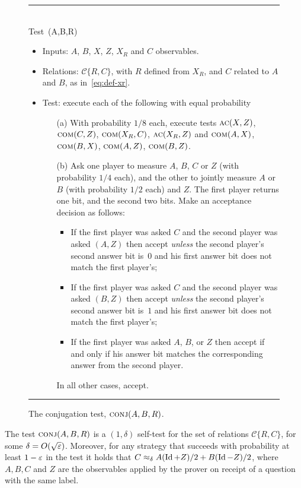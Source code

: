 \begin{figure}[H]
\rule[1ex]{\textwidth}{0.5pt}\\
Test~\conj(A,B,R) 
\begin{itemize}
    \item Inputs: $A$, $B$, $X$, $Z$, $X_R$ and $C$ observables.
    \item Relations:  $\mathcal{C}\{R,C\} $, with $R$ defined from $X_R$, and $C$ related to $A$ and $B$, as in~\eqref{eq:def-xr}. 
    \item Test: execute each of the following with equal probability
		\begin{enumerate}
\item[(a)] With probability $1/8$ each, execute tests $\textsc{ac}(X,Z)$,  $\textsc{com}(C,Z)$, $\textsc{com}(X_R,C)$,   $\textsc{ac}(X_R,Z)$ and $\textsc{com}(A,X)$, $\textsc{com}(B,X)$, $\textsc{com}(A,Z)$, $\textsc{com}(B,Z)$. 
\item[(b)] Ask one player to measure $A$, $B$, $C$ or $Z$ (with probability $1/4$ each), and the other to jointly measure $A$ or $B$ (with probability $1/2$ each) and $Z$. The first player returns one bit, and the second two bits. Make an acceptance decision as follows: 
\begin{itemize}
\item If the first player was asked $C$ and the second player was asked $(A,Z)$ then accept \emph{unless} the second player's second answer bit is~$0$ and his first answer bit does not match the first player's;
\item If the first player was asked $C$ and the second player was asked $(B,Z)$ then accept \emph{unless} the second player's second answer bit is~$1$ and his first answer bit does not match the first player's;
\item If the first player was asked $A$, $B$, or $Z$ then accept if and only if his answer bit matches the corresponding answer from the second player.
\end{itemize}
In all other cases, accept. 
\end{enumerate}
\end{itemize}
\rule[2ex]{\textwidth}{0.5pt}\vspace{-0.5cm}
\caption{The conjugation test, $\textsc{conj}(A,B,R)$.}
\label{fig:conjugation-test-1}
\end{figure}

\begin{lemma}\label{lem:conj}
The test $\textsc{conj}(A,B,R)$ is a $(1,\delta)$ self-test for the set of relations
  $\mathcal{C}\{R,C\}$, for some $\delta = O(\sqrt{\varepsilon})$. Moreover, for any
  strategy that succeeds with probability at least $1-\varepsilon$ in the test it holds
  that $C \approx_{\delta} A  (\mathop{\rm Id}\nolimits+Z)/2 + B
 (\mathop{\rm Id}\nolimits-Z)/2$, where $A,B,C$ and $Z$ are the observables applied by the prover on receipt of a question with the same label. 
\end{lemma}

